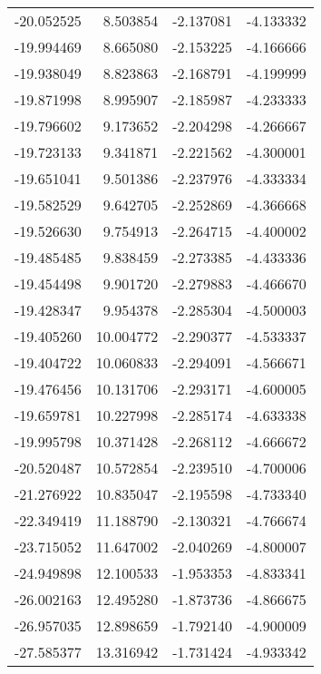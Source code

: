 \begin{tabular}{rrrr}
      -20.052525 &         8.503854 &   -2.137081 &  -4.133332 \\
      -19.994469 &         8.665080 &   -2.153225 &  -4.166666 \\
      -19.938049 &         8.823863 &   -2.168791 &  -4.199999 \\
      -19.871998 &         8.995907 &   -2.185987 &  -4.233333 \\
      -19.796602 &         9.173652 &   -2.204298 &  -4.266667 \\
      -19.723133 &         9.341871 &   -2.221562 &  -4.300001 \\
      -19.651041 &         9.501386 &   -2.237976 &  -4.333334 \\
      -19.582529 &         9.642705 &   -2.252869 &  -4.366668 \\
      -19.526630 &         9.754913 &   -2.264715 &  -4.400002 \\
      -19.485485 &         9.838459 &   -2.273385 &  -4.433336 \\
      -19.454498 &         9.901720 &   -2.279883 &  -4.466670 \\
      -19.428347 &         9.954378 &   -2.285304 &  -4.500003 \\
      -19.405260 &        10.004772 &   -2.290377 &  -4.533337 \\
      -19.404722 &        10.060833 &   -2.294091 &  -4.566671 \\
      -19.476456 &        10.131706 &   -2.293171 &  -4.600005 \\
      -19.659781 &        10.227998 &   -2.285174 &  -4.633338 \\
      -19.995798 &        10.371428 &   -2.268112 &  -4.666672 \\
      -20.520487 &        10.572854 &   -2.239510 &  -4.700006 \\
      -21.276922 &        10.835047 &   -2.195598 &  -4.733340 \\
      -22.349419 &        11.188790 &   -2.130321 &  -4.766674 \\
      -23.715052 &        11.647002 &   -2.040269 &  -4.800007 \\
      -24.949898 &        12.100533 &   -1.953353 &  -4.833341 \\
      -26.002163 &        12.495280 &   -1.873736 &  -4.866675 \\
      -26.957035 &        12.898659 &   -1.792140 &  -4.900009 \\
      -27.585377 &        13.316942 &   -1.731424 &  -4.933342 \\

\end{tabular}
